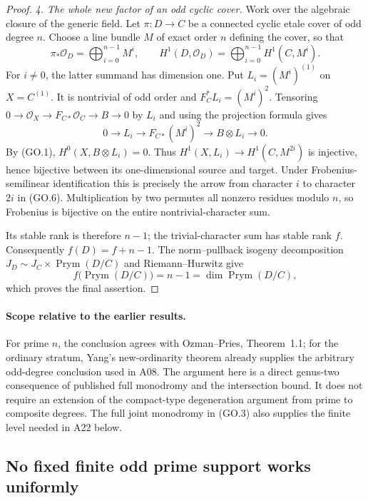 \documentclass[11pt,a4paper]{article}
\begin{document}
\begin{proof}
\emph{4. The whole new factor of an odd cyclic cover.}
Work over the algebraic closure of the generic field.
Let $\pi:D\to C$ be a connected cyclic etale cover of
odd degree $n$.  Choose a line bundle $M$ of exact order
$n$ defining the cover, so that
\[
 \pi_*\mathcal O_D=\bigoplus_{i=0}^{n-1}M^i,\qquad
 H^1(D,\mathcal O_D)=\bigoplus_{i=0}^{n-1}H^1(C,M^i).
                                                               \tag{GO.6}
\]
For $i\ne0$, the latter summand has dimension one.
Put $L_i=(M^i)^{(1)}$ on $X=C^{(1)}$.  It is nontrivial
of odd order and $F_{C}^*L_i=(M^i)^2$.  Tensoring
$0\to\mathcal O_X\to F_{C*}\mathcal O_C\to B\to0$
by $L_i$ and using the projection formula gives
\[
 0\longrightarrow L_i\longrightarrow F_{C*}(M^i)^2
                 \longrightarrow B\otimes L_i
                 \longrightarrow0.                          \tag{GO.7}
\]
By (GO.1), $H^0(X,B\otimes L_i)=0$.  Thus
$H^1(X,L_i)\to H^1(C,M^{2i})$ is injective, hence
bijective between its one-dimensional source and target.
Under Frobenius-semilinear identification this is precisely
the arrow from character $i$ to character $2i$ in (GO.6).
Multiplication by two permutes all nonzero residues
modulo $n$, so Frobenius is bijective on the entire
nontrivial-character sum.

Its stable rank is therefore $n-1$; the trivial-character
sum has stable rank $f$.  Consequently
$f(D)=f+n-1$.  The norm--pullback isogeny decomposition
$J_D\sim J_C\times\operatorname{Prym}(D/C)$ and
Riemann--Hurwitz give
\[
 f\bigl(\operatorname{Prym}(D/C)\bigr)=n-1
       =\dim\operatorname{Prym}(D/C),
\]
which proves the final assertion.
\end{proof}

\paragraph{Scope relative to the earlier results.}
For prime $n$, the conclusion agrees with Ozman--Pries,
Theorem~1.1; for the ordinary stratum, Yang's
new-ordinarity theorem already supplies the arbitrary
odd-degree conclusion used in A08.
The argument here is a direct genus-two consequence of
published full monodromy and the intersection bound.  It
does not require an extension of the compact-type
degeneration argument from prime to composite degrees.
The full joint monodromy in (GO.3) also supplies the finite
level needed in A22 below.


\subsection{No fixed finite odd prime support works uniformly}
\label{sec:no-fixed-prime-support}
\end{document}
